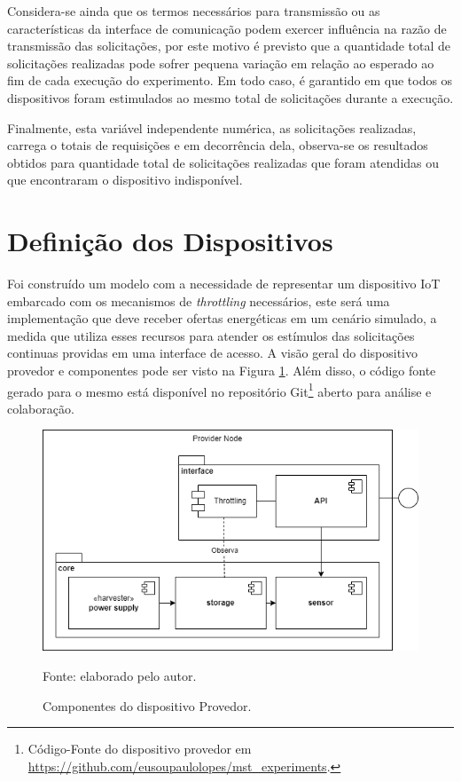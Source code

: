 Considera-se ainda que os termos necessários para transmissão ou as características da interface de comunicação podem exercer influência na razão de transmissão das solicitações, por este motivo é previsto que a quantidade total de solicitações realizadas pode sofrer pequena variação em relação ao esperado ao fim de cada execução do experimento. Em todo caso, é garantido em que todos os dispositivos foram estimulados ao mesmo total de solicitações durante a execução.

Finalmente, esta variável independente numérica, as solicitações realizadas, carrega o totais de requisições e em decorrência dela, observa-se os resultados obtidos para  quantidade total de solicitações realizadas que foram atendidas ou que encontraram o dispositivo indisponível.


\section{Definição dos Dispositivos}

Foi construído um modelo com a necessidade de representar um dispositivo \acs{IoT} embarcado com os mecanismos de \textit{throttling} necessários, este será uma implementação que deve receber ofertas energéticas em um cenário simulado, a medida que utiliza esses recursos para atender os estímulos das solicitações continuas providas em uma interface de acesso. A visão geral do dispositivo provedor e componentes pode ser visto na Figura \ref{fig:cap6providernode}. Além disso, o código fonte gerado para o mesmo está disponível no repositório Git\footnote{Código-Fonte do dispositivo provedor em \url{https://github.com/eusoupaulolopes/mst_experiments}.} aberto para análise e colaboração.

\begin{figure}[H]
	\centering
	
	\caption{Componentes do dispositivo Provedor.}
	\label{fig:cap6providernode}
	\noindent\includegraphics[width=0.75\linewidth]{Imagens/cap6/cap6providernode.png} 
	
	Fonte: elaborado pelo autor.
\end{figure}

